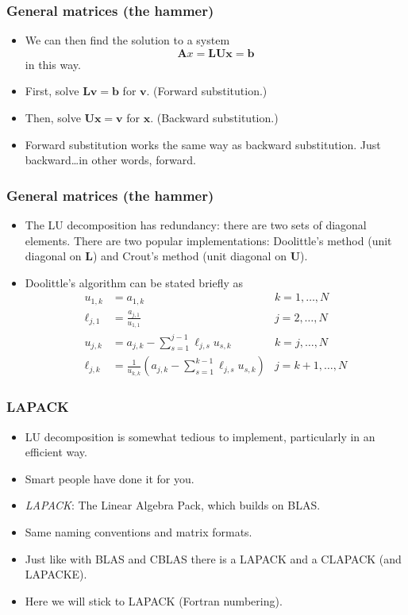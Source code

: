 \begin{frame}[fragile]
  \frametitle{General matrices (the hammer)}
  \begin{itemize}
  \item We can then find the solution to a system
    \[ \bm A x = \bm L \bm U \bm x = \bm b \]
    in this way.
  \item First, solve $\bm L \bm v = \bm b$ for $\bm v$. (Forward substitution.)
  \item Then, solve $\bm U \bm x = \bm v$ for $\bm x$. (Backward substitution.)
  \item Forward substitution works the same way as backward substitution. Just
    backward\ldots in other words, forward.
  \end{itemize}
\end{frame}

\begin{frame}
  \frametitle{General matrices (the hammer)}
  \begin{itemize}
  \item The LU decomposition has redundancy: there are two sets of diagonal
    elements. There are two popular implementations: Doolittle's method (unit
    diagonal on $\bm L$) and Crout's method (unit diagonal on $\bm U$).
  \item Doolittle's algorithm can be stated briefly as
    \begin{align*}
      u_{1,k} &= a_{1,k} & k = 1,\ldots,N \\
      \ell_{j,1} &= \frac{a_{j,1}}{u_{1,1}} & j = 2,\ldots,N \\
      u_{j,k} &= a_{j,k} - \sum_{s=1}^{j-1} \ell_{j,s} u_{s,k} & k = j,\ldots,N \\
      \ell_{j,k} &= \frac{1}{u_{k,k}}\left( a_{j,k} - \sum_{s=1}^{k-1} \ell_{j,s} u_{s,k} \right)
                         & j = k+1,\ldots,N
    \end{align*}
  \end{itemize}
\end{frame}

\begin{frame}
  \frametitle{LAPACK}
  \begin{itemize}
  \item LU decomposition is somewhat tedious to implement, particularly in an
    efficient way.
  \item Smart people have done it for you.
  \item \emph{LAPACK}: The Linear Algebra Pack, which builds on BLAS.
  \item Same naming conventions and matrix formats.
  \item Just like with BLAS and CBLAS there is a LAPACK and a CLAPACK (and
    LAPACKE).
  \item Here we will stick to LAPACK (Fortran numbering).
  \end{itemize}
\end{frame}

